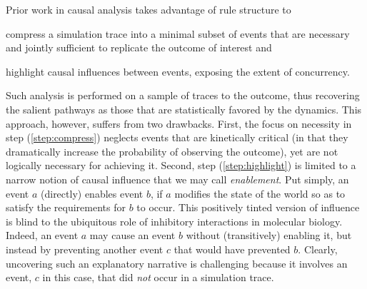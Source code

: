 Prior work in causal analysis
\cite{DBLP:conf/fsttcs/DanosFFHH12,DanosEtAl-CONCUR07} takes advantage
of rule structure to
\begin{inparaenum}[(i)]
\item \label{step:compress} compress a simulation trace into a minimal
  subset of events that are necessary and jointly sufficient to
  replicate the outcome of interest and
\item \label{step:highlight} highlight causal influences between
  events, exposing the extent of concurrency.
\end{inparaenum}
Such analysis is performed on a sample of traces to the outcome, thus recovering
the salient pathways as those that are statistically favored by the dynamics.
This approach, however, suffers from two drawbacks. First, the focus on
necessity in step (\ref{step:compress}) neglects events that are kinetically
critical (in that they dramatically increase the probability of observing the
outcome), yet are not logically necessary for achieving it. Second, step
(\ref{step:highlight}) is limited to a narrow notion of causal influence that we
may call \emph{enablement}. Put simply, an event $a$ (directly) enables event
$b$, if $a$ modifies the state of the world so as to satisfy the requirements
for $b$ to occur. This positively tinted version of influence is blind to the
ubiquitous role of inhibitory interactions in molecular biology.  Indeed, an
event $a$ may cause an event $b$ without (transitively) enabling it, but instead
by preventing another event $c$ that would have prevented $b$. Clearly,
uncovering such an explanatory narrative is challenging because it involves an
event, $c$ in this case, that did \emph{not} occur in a simulation trace.

